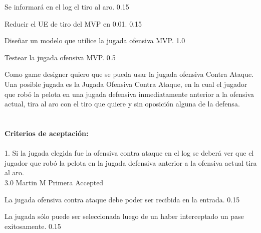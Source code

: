 		{Se informará en el log el tiro al aro.} %
		{} %
		{0.15} %
		{} %
		{} %
		{} %

		{Reducir el UE de tiro del MVP en 0.01.} %
		{} %
		{0.15} %
		{} %
		{} %
		{} %

		{Diseñar un modelo que utilice la jugada ofensiva MVP.} %
		{} %
		{1.0} %
		{} %
		{} %
		{} %

		{Testear la jugada ofensiva MVP.} %
		{} %
		{0.5} %
		{} %
		{} %
		{} %

\vspace{20pt}


	{Como game designer quiero que se pueda usar la jugada ofensiva Contra Ataque.} %
	{Una posible jugada es la Jugada Ofensiva Contra Ataque, en la cual el jugador que robó la pelota en una jugada defensiva inmediatamente anterior a la ofensiva actual, tira al aro con el tiro que quiere y sin oposición alguna de la defensa. \\
  \\
  \\
\textbf{Criterios de aceptación:}\\
  \\
1. Si la jugada elegida fue la ofensiva contra ataque en el log se deberá ver que el jugador que robó la pelota en la jugada defensiva anterior a la ofensiva actual tira al aro. \\
} %
	{} %
	{3.0} %
	{Martin M} %
	{Primera} %
	{Accepted} %

		{La jugada ofensiva contra ataque debe poder ser recibida en la entrada.} %
		{} %
		{0.15} %
		{} %
		{} %
		{} %

		{La jugada sólo puede ser seleccionada luego de un haber interceptado un pase exitosamente.} %
		{} %
		{0.15} %
		{} %
		{} %
		{} %

